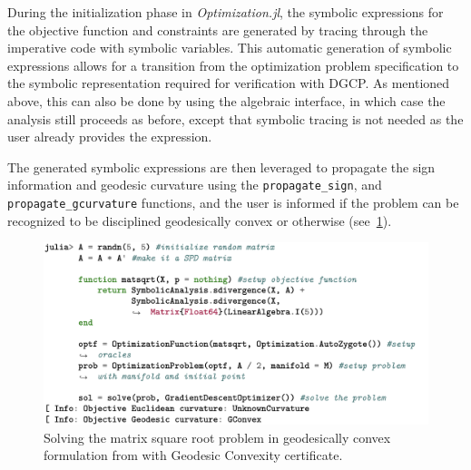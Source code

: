 \documentclass[twoside,11pt]{article}
\begin{document}
During the initialization phase in \textsl{Optimization.jl}, the symbolic expressions for the objective function and constraints are generated by tracing through the imperative code with symbolic variables. This automatic generation of symbolic expressions allows for a transition from the optimization problem specification to the symbolic representation required for verification with DGCP. As mentioned above, this can also be done by using the algebraic interface, in which case the analysis still proceeds as before, except that symbolic tracing is not needed as the user already provides the expression.

The generated symbolic expressions are then leveraged to propagate the sign information and geodesic curvature using the \texttt{propagate\_sign}, and \texttt{propagate\_gcurvature} functions, and the user is informed if the problem can be recognized to be disciplined geodesically convex or otherwise (see~\ref{listing:verificationproblem}).
%



%

\begin{figure}
    \centering
    \includegraphics[width=\linewidth]{listing/4.png}
    \caption{Solving the matrix square root problem in geodesically convex formulation from \citep{sra2015matrix} with Geodesic Convexity certificate.}
    \label{listing:verificationproblem}
\end{figure}
\end{document}
